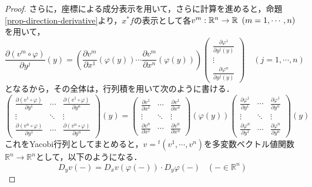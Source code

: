 \documentclass[uplatex, dvipdfmx]{jsreport}
\begin{document}
\begin{proof}
    さらに，座標による成分表示を用いて，さらに計算を進めると，命題\ref{prop-direction-derivative}より，$x^*f$の表示として各$v^m:\mathbb{R}^n\to\mathbb{R}\hspace{0.5em}(m=1,\cdots,n)$を用いて，
    \[ \frac{\partial (v^m\circ \varphi)}{\partial y^j}(y) = \left( \frac{\partial v^m}{\partial x^1}(\varphi(y)) \cdots \frac{\partial v^m}{\partial x^n}(\varphi(y)) \right) \left( \begin{array}{c}
        \frac{\partial \varphi^1}{\partial y^j(y)} \\ \vdots \\ \frac{\partial \varphi^n}{\partial y^j(y)}
    \end{array} \right)\hspace{1em} (j=1,\cdots,n) \]
    となるから，その全体は，行列積を用いて次のように書ける．
    \[ \left(\begin{array}{lcr}
        \frac{\partial (v^1\circ\varphi)}{\partial y^1} &\cdots&  \frac{\partial (v^1\circ\varphi)}{\partial y^n} \\
        \vdots &\ddots& \vdots \\
        \frac{\partial (v^n\circ\varphi)}{\partial y^1} &\cdots& \frac{\partial (v^n\circ\varphi)}{\partial y^n}
    \end{array}\right)(y)
    =
    \left( \begin{array}{lcr}
        \frac{\partial v^1}{\partial x^1} &\cdots& \frac{\partial v^1}{\partial x^n} \\
        \vdots&\ddots&\vdots\\
        \frac{\partial v^n}{\partial x^1} &\cdots& \frac{\partial v^n}{\partial x^n}
    \end{array} \right)(\varphi(y))
    \left(\begin{array}{lcr}
        \frac{\partial \varphi^1}{\partial y^1} & \cdots & \frac{\partial \varphi^1}{\partial y^n}\\
        \vdots&\ddots&\vdots\\
        \frac{\partial \varphi^n}{\partial y^1} & \cdots & \frac{\partial \varphi^n}{\partial y^n}
    \end{array}\right)(y)    \]
    これをYacobi行列としてまとめると，$v={}^t\!(v^1,\cdots,v^n)$を多変数ベクトル値関数$\mathbb{R}^n\to\mathbb{R}^n$として，以下のようになる．
    \[ D_yv(-) = D_xv(\varphi(-))\cdot D_y\varphi(-)\;\;\; (-\in\mathbb{R}^n) \]
    

\end{proof}
\end{document}
